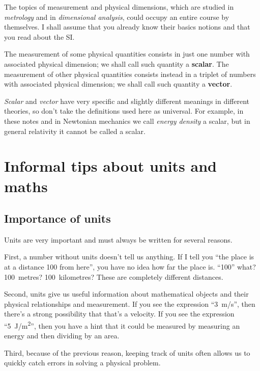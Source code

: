 \documentclass[a4paper,12pt,%
onecolumn,oneside,titlepage,%
british%
]{memoir}
\renewcommand*{\|}[1][]{\nonscript\:#1\vert\nonscript\:\mathopen{}}
\begin{document}
The topics of measurement and physical dimensions, which are studied in \emph{metrology} and in \emph{dimensional analysis}, could occupy an entire course by themselves. I shall assume that you already know their basics notions and that you read about the SI.

\smallskip

The measurement of some physical quantities consists in just one number with associated physical dimension; we shall call such quantity a \textbf{scalar}. The measurement of other physical quantities consists instead in a triplet of numbers with associated physical dimension; we shall call such quantity a \textbf{vector}.
\begin{warning}
  \emph{Scalar} and \emph{vector} have very specific and slightly different meanings in different theories, so don't take the definitions used here as universal. For example, in these notes and in Newtonian mechanics we call \emph{energy density} a scalar, but in general relativity it cannot be called a scalar.
\end{warning}

\section{Informal tips about units and maths}
\label{sec:units_maths}

\subsection{Importance of units}
\label{sec:importance_units}

Units are very important and must always be written for several reasons.

First, a number without units doesn't tell us anything. If I tell you \enquote{the place is at a distance 100 from here}, you have no idea how far the place is. \enquote{100} what? 100~metres? 100~kilometres? These are completely different distances.

Second, units give us useful information about mathematical objects and their physical relationships and measurement. If you see the expression \enquote{\qty{3}{m/s}}, then there's a strong possibility that that's a velocity. If you see the expression \enquote{\qty{5}{J/m^2}}, then you have a hint that it could be measured by measuring an energy and then dividing by an area.

Third, because of the previous reason, keeping track of units often allows us to quickly catch errors in solving a physical problem.
\end{document}
